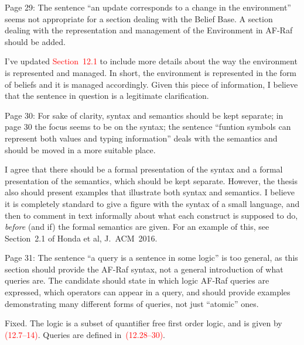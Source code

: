\documentclass{article}
\newcommand*\R[1]{\textcolor{red}{#1}} %
\newenvironment{them}{\noindent\begingroup\color{blue}}{\endgroup\par}
\begin{document}
\begin{them}

Page 29:
The sentence ``an update corresponds to a change in the environment'' seems not
appropriate for a section dealing with the Belief Base. A section dealing with
the representation and management of the Environment in AF-Raf should be added.

\end{them}
I've updated \R{Section~12.1} to include more details about the way the
environment is represented and managed. In short, the environment is
represented in the form of beliefs and it is managed accordingly. Given this
piece of information, I believe that the sentence in question is a legitimate
clarification.

\begin{them}

Page 30:
For sake of clarity, syntax and semantics should be kept separate; in page 30
the focus seems to be on the syntax; the sentence ``funtion symbols can
represent both values and typing information'' deals with the semantics and
should be moved in a more suitable place.

\end{them}

I agree that there should be a formal presentation of the syntax
  and a formal presentation of the semantics,
  which should be kept separate.
However, the thesis also should present examples
  that illustrate both syntax and semantics.
I believe it is completely standard to give a figure
  with the syntax of a small language,
and then to comment in text informally about what each construct
  is supposed to do,
  \emph{before} (and if) the formal semantics are given.
For an example of this,
  see Section~2.1 of Honda et al, J.~ACM~2016.


\begin{them}

Page 31:
The sentence ``a query is a sentence in some logic'' is too general, as this
section should provide the AF-Raf syntax, not a general introduction of what
queries are. The candidate should state in which logic AF-Raf queries are
expressed, which operators can appear in a query, and should provide examples
demonstrating many different forms of queries, not just ``atomic'' ones.

\end{them}
Fixed.
The logic is a subset of quantifier free first order logic,
  and is given by \R{(12.7--14)}.
Queries are defined in~\R{(12.28--30)}.
\end{document}
